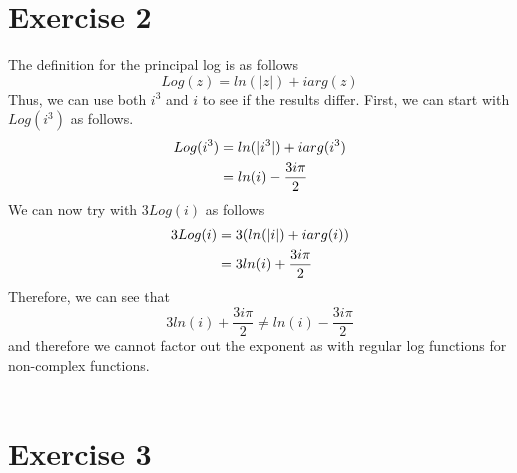 \documentclass[notitlepage]{article}
\newcommand{\HwBreak}{%
  \par\noindent\makebox[\linewidth]{\rule{0.9\paperwidth}{0.4pt}}\par%
}
\begin{document}
\section*{Exercise 2}
    The definition for the principal log is as follows
    $$Log(z) = ln(|z|) + iarg(z)$$
    Thus, we can use both $i^3$ and $i$ to see if the results differ. First, we can start with $Log(i^3)$ as follows.
   \begin{equation}
    \begin{aligned}
        Log(i^3)    &= ln(|i^3|) + i arg(i^3) \notag \\
                    &= ln(i) -\frac{3i\pi}{2}
    \end{aligned}
\end{equation}
    We can now try with $3Log(i)$ as follows
 \begin{equation}
    \begin{aligned}
        3Log(i)    &= 3(ln(|i|) + i arg(i)) \notag \\
                    &= 3ln(i) + \frac{3i\pi}{2}
    \end{aligned}
\end{equation}
    Therefore, we can see that $$3ln(i) + \frac{3i\pi}{2} \neq ln(i) -\frac{3i\pi}{2}$$ and therefore we cannot factor out the exponent as with regular log functions for non-complex functions. \\~\\

    \HwBreak
\section*{Exercise 3}
\end{document}
